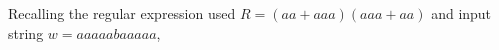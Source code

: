 Recalling the regular expression used $R = (aa+aaa)(aaa+aa)$ and input string $w = aaaaabaaaaa$, 


%
%
%
%


